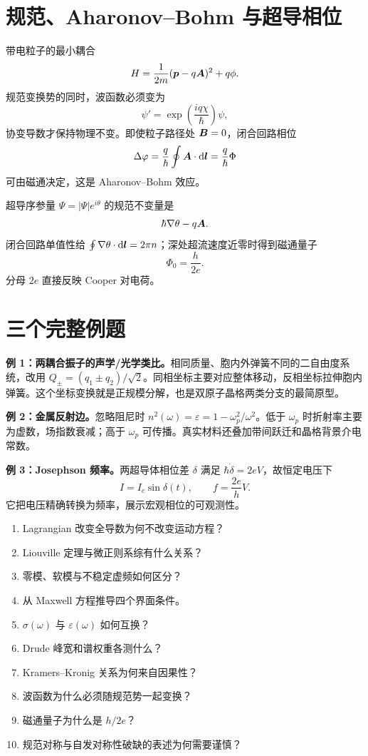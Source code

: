 \section{规范、Aharonov--Bohm 与超导相位}
带电粒子的最小耦合
\[
H=\frac1{2m}(\bm{p}-q\bm{A})^2+q\phi.
\]
规范变换势的同时，波函数必须变为
\[
\psi'=\exp\left(\frac{iq\chi}{\hbar}\right)\psi,
\]
协变导数才保持物理不变。即使粒子路径处 $\bm{B}=0$，闭合回路相位
\[
\Delta\varphi=\frac q\hbar\oint\bm{A}\cdot\mathrm d\bm{l}
=\frac q\hbar\Phi
\]
可由磁通决定，这是 Aharonov--Bohm 效应。

超导序参量
$\Psi=|\Psi|e^{i\theta}$ 的规范不变量是
\[
\hbar\nabla\theta-q\bm{A}.
\]
闭合回路单值性给
$\oint\nabla\theta\cdot\mathrm d\bm{l}=2\pi n$；深处超流速度近零时得到磁通量子
\[
\Phi_0=\frac h{2e}.
\]
分母 $2e$ 直接反映 Cooper 对电荷。

\section{三个完整例题}
\begin{examplebox}
\textbf{例 1：两耦合振子的声学/光学类比。}相同质量、胞内外弹簧不同的二自由度系统，改用
$Q_\pm=(q_1\pm q_2)/\sqrt2$。同相坐标主要对应整体移动，反相坐标拉伸胞内弹簧。这个坐标变换就是正规模分解，也是双原子晶格两类分支的最简原型。
\end{examplebox}
\begin{examplebox}
\textbf{例 2：金属反射边。}忽略阻尼时
$n^2(\omega)=\varepsilon=1-\omega_p^2/\omega^2$。低于 $\omega_p$ 时折射率主要为虚数，场指数衰减；高于 $\omega_p$ 可传播。真实材料还叠加带间跃迁和晶格背景介电常数。
\end{examplebox}
\begin{examplebox}
\textbf{例 3：Josephson 频率。}两超导体相位差 $\delta$ 满足
$\hbar\dot\delta=2eV$，故恒定电压下
\[
I=I_c\sin\delta(t),\qquad f=\frac{2e}{h}V.
\]
它把电压精确转换为频率，展示宏观相位的可观测性。
\end{examplebox}

\clearpage
\begin{selftestbox}
\small
\begin{enumerate}
\item Lagrangian 改变全导数为何不改变运动方程？
\item Liouville 定理与微正则系综有什么关系？
\item 零模、软模与不稳定虚频如何区分？
\item 从 Maxwell 方程推导四个界面条件。
\item $\sigma(\omega)$ 与 $\varepsilon(\omega)$ 如何互换？
\item Drude 峰宽和谱权重各测什么？
\item Kramers--Kronig 关系为何来自因果性？
\item 波函数为什么必须随规范势一起变换？
\item 磁通量子为什么是 $h/2e$？
\item 规范对称与自发对称性破缺的表述为何需要谨慎？
\end{enumerate}
\end{selftestbox}
